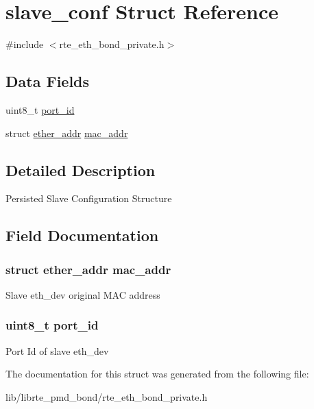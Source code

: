 \hypertarget{structslave__conf}{}\section{slave\+\_\+conf Struct Reference}
\label{structslave__conf}


{\ttfamily \#include $<$rte\+\_\+eth\+\_\+bond\+\_\+private.\+h$>$}

\subsection*{Data Fields}
\begin{DoxyCompactItemize}
\item 
uint8\+\_\+t \hyperlink{structslave__conf_aae6814cc8987b1899b9d94cb621857c3}{port\+\_\+id}
\item 
struct \hyperlink{structether__addr}{ether\+\_\+addr} \hyperlink{structslave__conf_a748f7227165cdae6fa82f31c46280948}{mac\+\_\+addr}
\end{DoxyCompactItemize}


\subsection{Detailed Description}
Persisted Slave Configuration Structure 

\subsection{Field Documentation}
\hypertarget{structslave__conf_a748f7227165cdae6fa82f31c46280948}{}
\subsubsection[{mac\+\_\+addr}]{\setlength{\rightskip}{0pt plus 5cm}struct {\bf ether\+\_\+addr} mac\+\_\+addr}\label{structslave__conf_a748f7227165cdae6fa82f31c46280948}
Slave eth\+\_\+dev original M\+A\+C address \hypertarget{structslave__conf_aae6814cc8987b1899b9d94cb621857c3}{}
\subsubsection[{port\+\_\+id}]{\setlength{\rightskip}{0pt plus 5cm}uint8\+\_\+t port\+\_\+id}\label{structslave__conf_aae6814cc8987b1899b9d94cb621857c3}
Port Id of slave eth\+\_\+dev 

The documentation for this struct was generated from the following file\+:\begin{DoxyCompactItemize}
\item 
lib/librte\+\_\+pmd\+\_\+bond/rte\+\_\+eth\+\_\+bond\+\_\+private.\+h\end{DoxyCompactItemize}
